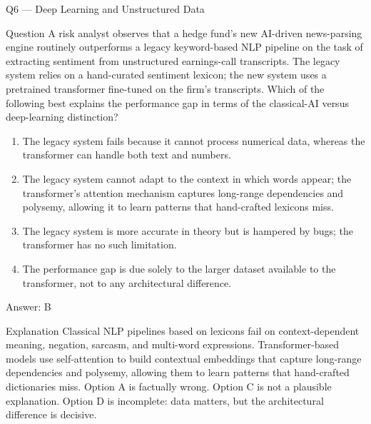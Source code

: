 \documentclass[aspectratio=169,8pt]{beamer}
\begin{document}
	
	\begin{frame}{Q6 --- Deep Learning and Unstructured Data}
		\begin{block}{Question}
			A risk analyst observes that a hedge fund's new AI-driven news-parsing engine routinely outperforms a legacy keyword-based NLP pipeline on the task of extracting sentiment from unstructured earnings-call transcripts. The legacy system relies on a hand-curated sentiment lexicon; the new system uses a pretrained transformer fine-tuned on the firm's transcripts. Which of the following best explains the performance gap in terms of the classical-AI versus deep-learning distinction?
		\end{block}
		\begin{enumerate}
			\item The legacy system fails because it cannot process numerical data, whereas the transformer can handle both text and numbers.
			\item The legacy system cannot adapt to the context in which words appear; the transformer's attention mechanism captures long-range dependencies and polysemy, allowing it to learn patterns that hand-crafted lexicons miss.
			\item The legacy system is more accurate in theory but is hampered by bugs; the transformer has no such limitation.
			\item The performance gap is due solely to the larger dataset available to the transformer, not to any architectural difference.
		\end{enumerate}
		\begin{exampleblock}{Answer: B}\end{exampleblock}
		\begin{block}{Explanation}
			Classical NLP pipelines based on lexicons fail on context-dependent meaning, negation, sarcasm, and multi-word expressions. Transformer-based models use self-attention to build contextual embeddings that capture long-range dependencies and polysemy, allowing them to learn patterns that hand-crafted dictionaries miss. Option A is factually wrong. Option C is not a plausible explanation. Option D is incomplete: data matters, but the architectural difference is decisive.
		\end{block}
	\end{frame}
	
\end{document}
